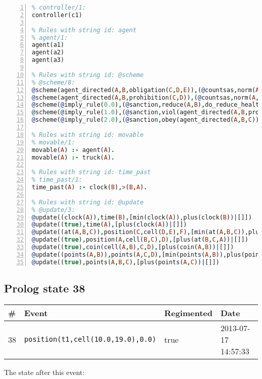 \documentclass[11pt]{article}\usepackage[utf8]{inputenc}\usepackage{geometry}
\begin{document}
\begin{lstlisting}[language=Prolog, numbers=left]
% Rules with string id: controller
% controller/1:
controller(c1)

% Rules with string id: agent
% agent/1:
agent(a1)
agent(a2)
agent(a3)

% Rules with string id: @scheme
% @scheme/8:
@scheme(agent_directed(A,B,obligation(C,D,E)),(@countsas,norm(A,B,F,obligation(C,D,E)),F),false,(listTrue(C)),(time_past(D)),false,[plus(viol(agent_directed(A,B,obligation(C,D,E))))|[]],[plus(obey(agent_directed(A,B,obligation(C,D,E))))|[]])
@scheme(agent_directed(A,B,prohibition(C,D)),(@countsas,norm(A,B,E,prohibition(C,D)),E),(listTrue(C)),false,(false),false,[plus(viol(agent_directed(A,B,prohibition(C,D))))|[]],[plus(obey(agent_directed(A,B,prohibition(C,D))))|[]])
@scheme(@imply_rule(0.0),(@sanction,reduce(A,B),do_reduce_health(A,B),notifyAgent(A,changed(status))),true,false,false,false,[min(reduce(A,B))|[]],[])
@scheme(@imply_rule(1.0),(@sanction,viol(agent_directed(A,B,prohibition(C,D))),do_sanction(D)),true,false,false,false,[min(viol(agent_directed(A,B,prohibition(C,D))))|[]],[])
@scheme(@imply_rule(2.0),(@sanction,obey(agent_directed(A,B,C))),true,false,false,false,[min(obey(agent_directed(A,B,C)))|[]],[])

% Rules with string id: movable
% movable/1:
movable(A) :- agent(A).
movable(A) :- truck(A).

% Rules with string id: time_past
% time_past/1:
time_past(A) :- clock(B),>(B,A).

% Rules with string id: @update
% @update/3:
@update((clock(A)),time(B),[min(clock(A)),plus(clock(B))|[]])
@update((true),time(A),[plus(clock(A))|[]])
@update((at(A,B,C)),position(C,cell(D,E),F),[min(at(A,B,C)),plus(at(D,E,C))|[]])
@update((true),position(A,cell(B,C),D),[plus(at(B,C,A))|[]])
@update((true),coin(cell(A,B),C,D),[plus(coin(A,B))|[]])
@update((points(A,B)),points(A,C,D),[min(points(A,B)),plus(points(A,D))|[]])
@update((true),points(A,B,C),[plus(points(A,C))|[]])

\end{lstlisting}
\clearpage 
\subsection{Prolog state 38}
\begin{table}[ht]
\centering 
\begin{tabular}{l l l l} 
\textbf{\#} & \textbf{Event} & \textbf{Regimented} & \textbf{Date} \\ [0.5ex] 
\hline
38&\texttt{position(t1,cell(10.0,19.0),0.0)}&true&2013-07-17 14:57:33\\ [1ex] \hline\end{tabular}
\end{table}
The state after this event:
\end{document}
